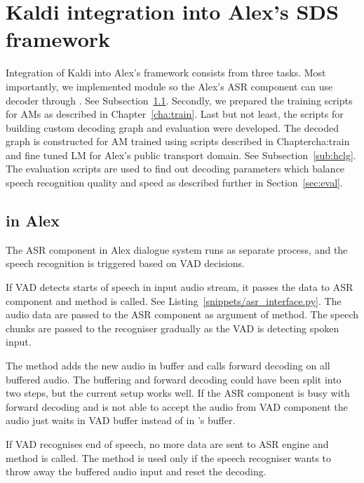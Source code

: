 \section[Kaldi integration into \acs{SDS} framework]{Kaldi integration into Alex's \acl{SDS} framework}
\label{sec:asrsds}

Integration of Kaldi into Alex's framework consists from three tasks.
Most importantly, we implemented  module so the Alex's \ac{ASR} component can use  decoder through .
See Subsection~\ref{sub:asr_component}.
Secondly, we prepared the training scripts for \acp{AM} as described in Chapter~\ref{cha:train}.
Last but not least, the scripts for building custom decoding graph  and evaluation were developed.
The decoded graph  is constructed for \ac{AM} trained using scripts described in Chapter{cha:train} and fine tuned \ac{LM} for Alex's public transport domain.
See Subsection~\ref{sub:hclg}.
The evaluation scripts are used to find out decoding parameters which balance speech recognition quality and speed as described further in Section~\ref{sec:eval}.

\subsection{ in Alex}
\label{sub:asr_component}
The \ac{ASR} component in Alex dialogue system runs as separate process, and the speech recognition is triggered based on \ac{VAD} decisions.

If \ac{VAD} detects starts of speech in input audio stream, it passes the data to \ac{ASR} component
and  method is called. See Listing~\ref{snippets/asr_interface.py}.
The audio data are passed to the ASR component as argument of  method.
The speech chunks are passed to the recogniser gradually as the \ac{VAD} is detecting spoken input.

The method  adds the new audio in  buffer and calls forward decoding on all buffered audio.
The buffering and forward decoding could have been split into two steps, but the current setup works well.
If the \ac{ASR} component is busy with forward decoding and is not able to accept the audio from \ac{VAD} component the audio just waits in \ac{VAD} buffer instead of in 's buffer.

If \ac{VAD} recognises end of speech, no more data are sent to \ac{ASR} engine and  method is called.
The  method is used only if the speech recogniser wants to throw away the buffered audio input and reset the decoding.

